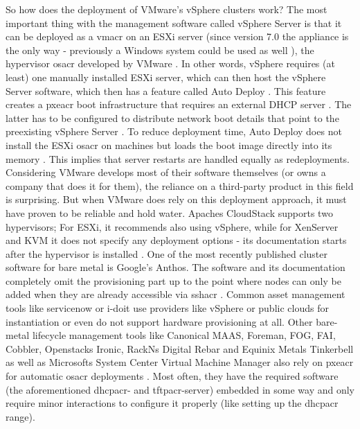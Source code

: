So how does the deployment of VMware's vSphere clusters work? The most important thing with the management software called vSphere Server is that it can be deployed as a \gls{vmacr} on an ESXi server (since version 7.0 the appliance is the only way - previously a Windows system could be used as well \cite{vmware_farewell_windows}), the hypervisor \gls{osacr} developed by VMware \cite{vmware_vsphere_installation} \cite{vmware_vcenter_deployment}. In other words, vSphere requires (at least) one manually installed ESXi server, which can then host the vSphere Server software, which then has a feature called Auto Deploy \cite{vmware_installing_esxi}. This feature creates a \gls{pxeacr} boot infrastructure that requires an external DHCP server \cite{vmware_intro_autodeploy} \cite{vmware_autodeploy_process}. The latter has to be configured to distribute network boot details that point to the preexisting vSphere Server \cite{vmware_intro_autodeploy}.
To reduce deployment time, Auto Deploy does not install the ESXi \gls{osacr} on machines but loads the boot image directly into its memory \cite{vmware_provisioning_esxi_using_autodeploy}. This implies that server restarts are handled equally as redeployments.
\newline
Considering VMware develops most of their software themselves (or owns a company that does it for them), the reliance on a third-party product in this field is surprising. But when VMware does rely on this deployment approach, it must have proven to be reliable and hold water. %
Apaches CloudStack supports two hypervisors; For ESXi, it recommends also using vSphere, while for XenServer and KVM it does not specify any deployment options - its documentation starts after the hypervisor is installed \cite{cloudstack_installation}.
\newline
One of the most recently published cluster software for bare metal is Google's Anthos. The software and its documentation completely omit the provisioning part up to the point where nodes can only be added when they are already accessible via \gls{sshacr} \cite{anthos_bare_metal}.
\newline
Common asset management tools like servicenow or i-doit use providers like vSphere or public clouds for instantiation \cite{servicenow_setup_guide_vmware_cloud} or even do not support hardware provisioning \cite{idoit_vm_provisioning} at all.
\newline
Other bare-metal lifecycle management tools like Canonical MAAS, Foreman, FOG, FAI, Cobbler, Openstacks Ironic, RackNs Digital Rebar and Equinix Metals Tinkerbell as well as Microsofts System Center Virtual Machine Manager also rely on \gls{pxeacr} for automatic \gls{osacr} deployments \cite{maas_how_it_works} \cite{foreman_what_is} \cite{fog_introduction} \cite{fai_how_does_it_work} \cite{cobbler_documentation} \cite{openstack_ironic_docs} \cite{rackn_what_is_digital_rebar} \cite{tinkerbell_architecture} \cite{microsoft_provision_hyperv_bare_metal}. Most often, they have the required software (the aforementioned \gls{dhcpacr}- and \gls{tftpacr}-server) embedded in some way and only require minor interactions to configure it properly (like setting up the \gls{dhcpacr} range).
